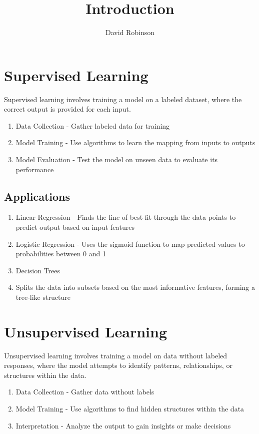 \documentclass{article}
\title{Introduction}
\author{David Robinson}
\date{}
\begin{document}
\maketitle

\section*{Supervised Learning}

Supervised learning involves training a model on a labeled dataset, where the correct output is provided for each input.

\begin{enumerate}
    \item Data Collection - Gather labeled data for training
    \item Model Training - Use algorithms to learn the mapping from inputs to outputs
    \item Model Evaluation - Test the model on unseen data to evaluate its performance
\end{enumerate}

\subsection*{Applications}

\begin{enumerate}
    \item Linear Regression - Finds the line of best fit through the data points to predict output based on input features
    \item Logistic Regression - Uses the sigmoid function to map predicted values to probabilities between 0 and 1
    \item Decision Trees
    \item Splits the data into subsets based on the most informative features, forming a tree-like structure
\end{enumerate}

\section*{Unsupervised Learning}

Unsupervised learning involves training a model on data without labeled responses, where the model attempts to identify patterns, relationships, or structures within the data.

\begin{enumerate}
    \item Data Collection - Gather data without labels
    \item Model Training - Use algorithms to find hidden structures within the data
    \item Interpretation - Analyze the output to gain insights or make decisions
\end{enumerate}
\end{document}
